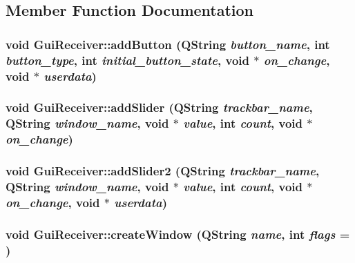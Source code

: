 \subsection{Member Function Documentation}
\hypertarget{classGuiReceiver_aa1507b4023e4881e37c4b2a2ba0c2353}{
\subsubsection[{addButton}]{\setlength{\rightskip}{0pt plus 5cm}void GuiReceiver::addButton (QString {\em button\_\-name}, \/  int {\em button\_\-type}, \/  int {\em initial\_\-button\_\-state}, \/  void $\ast$ {\em on\_\-change}, \/  void $\ast$ {\em userdata})}}
\label{classGuiReceiver_aa1507b4023e4881e37c4b2a2ba0c2353}
\hypertarget{classGuiReceiver_a8bd54a4f6d6f56083c2146173be6a1e3}{
\subsubsection[{addSlider}]{\setlength{\rightskip}{0pt plus 5cm}void GuiReceiver::addSlider (QString {\em trackbar\_\-name}, \/  QString {\em window\_\-name}, \/  void $\ast$ {\em value}, \/  int {\em count}, \/  void $\ast$ {\em on\_\-change})}}
\label{classGuiReceiver_a8bd54a4f6d6f56083c2146173be6a1e3}
\hypertarget{classGuiReceiver_a02ddc77f4583508363df717fd0859786}{
\subsubsection[{addSlider2}]{\setlength{\rightskip}{0pt plus 5cm}void GuiReceiver::addSlider2 (QString {\em trackbar\_\-name}, \/  QString {\em window\_\-name}, \/  void $\ast$ {\em value}, \/  int {\em count}, \/  void $\ast$ {\em on\_\-change}, \/  void $\ast$ {\em userdata})}}
\label{classGuiReceiver_a02ddc77f4583508363df717fd0859786}
\hypertarget{classGuiReceiver_a59873b996659d0bb92d09638902ec4dc}{
\subsubsection[{createWindow}]{\setlength{\rightskip}{0pt plus 5cm}void GuiReceiver::createWindow (QString {\em name}, \/  int {\em flags} = {})}}

